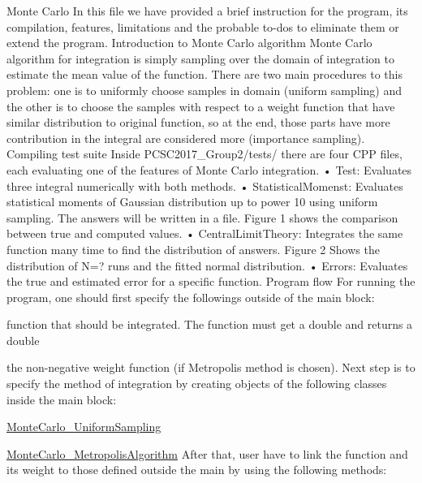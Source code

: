 Monte Carlo In this file we have provided a brief instruction for the program, its compilation, features, limitations and the probable to-\/dos to eliminate them or extend the program. Introduction to Monte Carlo algorithm Monte Carlo algorithm for integration is simply sampling over the domain of integration to estimate the mean value of the function. There are two main procedures to this problem\+: one is to uniformly choose samples in domain (uniform sampling) and the other is to choose the samples with respect to a weight function that have similar distribution to original function, so at the end, those parts have more contribution in the integral are considered more (importance sampling). Compiling test suite Inside P\+C\+S\+C2017\+\_\+\+Group2/tests/ there are four C\+PP files, each evaluating one of the features of Monte Carlo integration. • Test\+: Evaluates three integral numerically with both methods. • Statistical\+Momenst\+: Evaluates statistical moments of Gaussian distribution up to power 10 using uniform sampling. The answers will be written in a file. Figure 1 shows the comparison between true and computed values. • Central\+Limit\+Theory\+: Integrates the same function many time to find the distribution of answers. Figure 2 Shows the distribution of N=? runs and the fitted normal distribution. • Errors\+: Evaluates the true and estimated error for a specific function. Program flow For running the program, one should first specify the followings outside of the main block\+:
\begin{DoxyEnumerate}
\item function that should be integrated. The function must get a double and returns a double
\item the non-\/negative weight function (if Metropolis method is chosen). Next step is to specify the method of integration by creating objects of the following classes inside the main block\+:
\end{DoxyEnumerate}
\begin{DoxyEnumerate}
\item \hyperlink{class_monte_carlo___uniform_sampling}{Monte\+Carlo\+\_\+\+Uniform\+Sampling}
\item \hyperlink{class_monte_carlo___metropolis_algorithm}{Monte\+Carlo\+\_\+\+Metropolis\+Algorithm} After that, user have to link the function and its weight to those defined outside the main by using the following methods\+:
\end{DoxyEnumerate}
